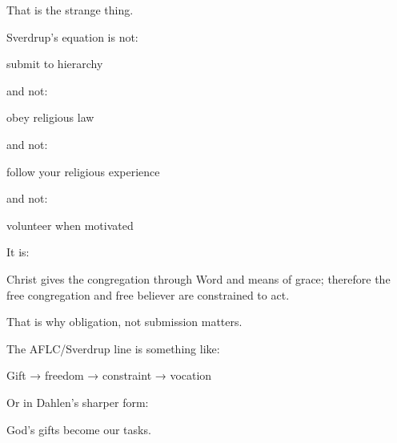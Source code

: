 That is the strange thing.

Sverdrup’s equation is not:

submit to hierarchy

and not:

obey religious law

and not:

follow your religious experience

and not:

volunteer when motivated

It is:

Christ gives the congregation through Word and means of grace; therefore the free congregation and free believer are constrained to act.

That is why obligation, not submission matters.

The AFLC/Sverdrup line is something like:

Gift → freedom → constraint → vocation

Or in Dahlen’s sharper form:

God’s gifts become our tasks.
